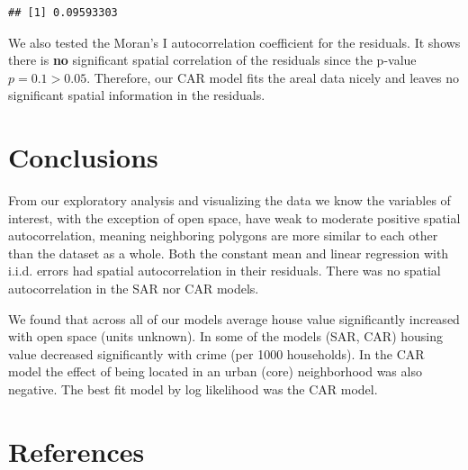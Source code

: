 \documentclass[
]{article}
\newenvironment{Shaded}{\begin{snugshade}}{\end{snugshade}}
\newcommand{\CommentTok}[1]{\textcolor[rgb]{0.56,0.35,0.01}{\textit{#1}}}
\newcommand{\FunctionTok}[1]{\textcolor[rgb]{0.00,0.00,0.00}{#1}}
\newcommand{\NormalTok}[1]{#1}
\newcommand{\SpecialCharTok}[1]{\textcolor[rgb]{0.00,0.00,0.00}{#1}}
\begin{document}
\begin{Shaded}
\end{Shaded}

\begin{verbatim}
## [1] 0.09593303
\end{verbatim}

We also tested the Moran's I autocorrelation coefficient for the
residuals. It shows there is \textbf{no} significant spatial correlation
of the residuals since the p-value \(p = 0.1 > 0.05\). Therefore, our
CAR model fits the areal data nicely and leaves no significant spatial
information in the residuals.

\hypertarget{conclusions}{%
\section{Conclusions}\label{conclusions}}

From our exploratory analysis and visualizing the data we know the
variables of interest, with the exception of open space, have weak to
moderate positive spatial autocorrelation, meaning neighboring polygons
are more similar to each other than the dataset as a whole. Both the
constant mean and linear regression with i.i.d. errors had spatial
autocorrelation in their residuals. There was no spatial autocorrelation
in the SAR nor CAR models.

We found that across all of our models average house value significantly
increased with open space (units unknown). In some of the models (SAR,
CAR) housing value decreased significantly with crime (per 1000
households). In the CAR model the effect of being located in an urban
(core) neighborhood was also negative. The best fit model by log
likelihood was the CAR model.

\hypertarget{references}{%
\section*{References}\label{references}}
\end{document}
